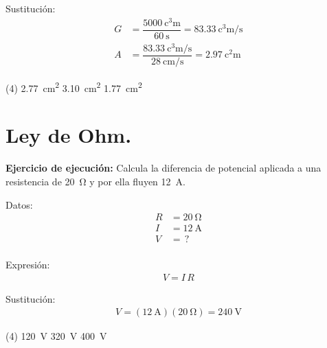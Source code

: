 \documentclass[12pt, letter]{exam}
\begin{document}
\begin{questions}
    Sustitución:
    \begin{align*}
    G &= \dfrac{\SI{5000}{\cubic\centi\meter}}{\SI{60}{\second}} = \SI[per-mode=fraction]{83.33}{\cubic\centi\meter\per\second} \\[0.5em]
    A &= \dfrac{\displaystyle \SI[per-mode=fraction]{83.33}{\cubic\centi\meter\per\second}}{\displaystyle \SI[per-mode=fraction]{28}{\centi\meter\per\second}} = \SI{2.97}{\square\centi\meter}
    \end{align*}
    
    \begin{tasks}(4)
        \task \SI{2.77}{\square\centi\meter}
        \task {}
        \task \SI{3.10}{\square\centi\meter}
        \task \SI{1.77}{\square\centi\meter}
    \end{tasks}

    \setcounter{section}{11}
    \section{Ley de Ohm.}

    \setcounter{question}{27} \question \label{Problema_03} \textbf{Ejercicio de ejecución: } Calcula la diferencia de potencial aplicada a una resistencia de \SI{20}{\ohm} y por ella fluyen \SI{12}{\ampere}.

    \begin{minipage}[t]{0.35\linewidth}
    Datos: 
    \begin{align*}
    R &= \SI{20}{\ohm} \\[0.3em]
    I &= \SI{12}{\ampere} \\[0.3em]
    V &= \, ? \\
    \end{align*}
    \end{minipage}
    \hspace{1cm}
    \begin{minipage}[t]{0.4\linewidth}
    Expresión:
    \begin{align*}
    V = I \, R
    \end{align*}
    \end{minipage}

    Sustitución:
    \begin{align*}
    V = (\SI{12}{\ampere})(\SI{20}{\ohm}) = \SI{240}{\volt}
    \end{align*}
    
    \vspace{0.3cm}    
    \begin{tasks}(4)
        \task \SI{120}{\volt}
        \task {}
        \task \SI{320}{\volt}
        \task \SI{400}{\volt}
    \end{tasks}


\end{questions}
\end{document}
